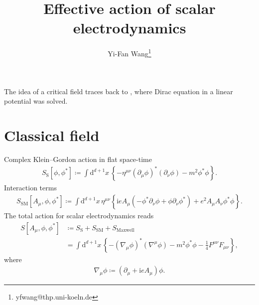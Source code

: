 \documentclass[12pt]{article}
\newcommand\mi{\mathrm{i}} %
\newcommand\dif{\mathrm{d}}
\newcommand{\rbr}[1]{{\left(#1\right)}}
\newcommand{\cbr}[1]{{\left\{#1\right\}}}
\newcommand{\sfun}[2]{{#1}\mathopen{}\left[#2\right]\mathclose{}}
\begin{document}
\title{Effective action of scalar electrodynamics} 


\date{}


\author[3]{Yi-Fan Wang\thanks{yfwang@thp.uni-koeln.de}}





\maketitle

%


The idea of a critical field traces back to \cite{Sauter1931}, where Dirac 
equation in a linear potential was solved.

\section{Classical field}
\label{sec:cla-fie}

Complex Klein--Gordon action in flat space-time
\begin{align}
\sfun{S_\text{S}}{\phi,\phi^*}\coloneqq\int\dif^{d+1}x\,\cbr{-\eta^{\mu\nu}
\rbr{\partial_\mu\phi}^* \rbr{\partial_\nu\phi} - m^2\phi^*\phi}.
\end{align}
Interaction terms
\begin{align}
\sfun{S_\text{SM}}{A_\mu,\phi,\phi^*} \coloneqq \int\dif^{d+1}x\,
\eta^{\mu\nu}{}
\cbr{\mi e A_\mu \rbr{-\phi^*\partial_\nu\phi+\phi\partial_\nu\phi^*}
+e^2 A_\mu A_\nu \phi^* \phi}.
\end{align}
The total action for scalar electrodynamics reads
\begin{align}
\sfun{S}{A_\mu, \phi, \phi^*} &\coloneqq 
S_\text{S} + S_\text{SM} + S_\text{Maxwell} \nonumber \\
&= \int\dif^{d+1}x\,\cbr{-\rbr{\nabla_{\!\mu} \phi}^* \rbr{\nabla^\mu\phi} - 
m^2\phi^*\phi -\frac{1}{4}F^{\mu\nu}F_{\mu\nu}},
\end{align}
where
\begin{align}
\nabla_\mu\phi \coloneqq \rbr{\partial_\mu+\mi e A_\mu}\phi.
\end{align}
\end{document}
